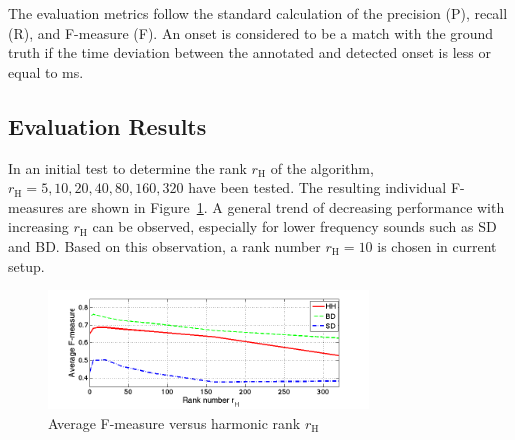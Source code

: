 \documentclass[a4paper]{article}
\newcommand{\figref}[1]{\mbox{Figure~\ref{#1}}}
\begin{document}

The evaluation metrics follow the standard calculation of the precision (P), recall (R), and F-measure (F).  %
An onset is considered to be a match with the ground truth if the time deviation between the annotated and detected onset is less or equal to \unit[50]{ms}.  

\subsection{Evaluation Results}\label{subsec:evaluation results}
In an initial test to determine the rank $r_\mathrm{H}$ of the algorithm, $r_\mathrm{H} = {5, 10, 20, 40, 80, 160, 320}$ have been tested. The resulting individual F-measures are shown in \figref{fig:rankTest}. A general trend of decreasing performance with increasing $r_\mathrm{H}$ can be observed, especially for lower frequency sounds such as SD and BD. Based on this observation, a rank number $r_\mathrm{H} = 10$ is chosen in current setup.


\begin{figure}
 \centerline{
 \includegraphics[width=8.5cm]{rankTest.png}}
 \caption{Average F-measure versus harmonic rank $r_\mathrm{H}$}%
 \label{fig:rankTest}
\end{figure}
\end{document}
